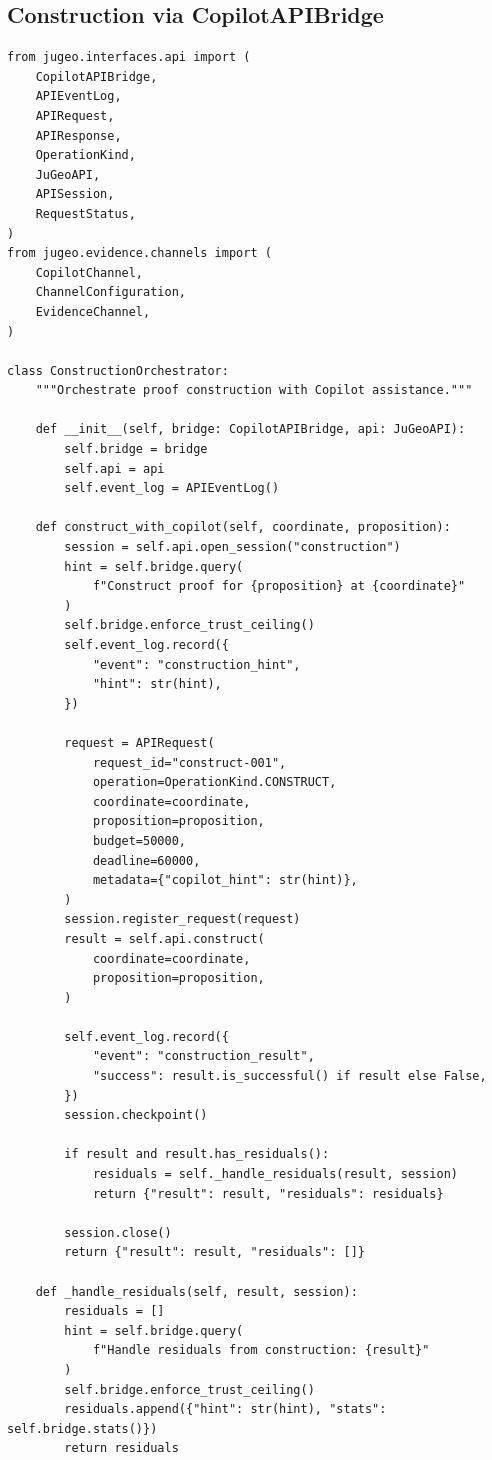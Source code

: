 \documentclass[11pt]{article}
\begin{document}
\subsection{Construction via CopilotAPIBridge}

\begin{lstlisting}[style=jugeo-python,
  caption={Proof construction with CopilotAPIBridge and JuGeoAPI},
  label={lst:conbridge}]
from jugeo.interfaces.api import (
    CopilotAPIBridge,
    APIEventLog,
    APIRequest,
    APIResponse,
    OperationKind,
    JuGeoAPI,
    APISession,
    RequestStatus,
)
from jugeo.evidence.channels import (
    CopilotChannel,
    ChannelConfiguration,
    EvidenceChannel,
)

class ConstructionOrchestrator:
    """Orchestrate proof construction with Copilot assistance."""

    def __init__(self, bridge: CopilotAPIBridge, api: JuGeoAPI):
        self.bridge = bridge
        self.api = api
        self.event_log = APIEventLog()

    def construct_with_copilot(self, coordinate, proposition):
        session = self.api.open_session("construction")
        hint = self.bridge.query(
            f"Construct proof for {proposition} at {coordinate}"
        )
        self.bridge.enforce_trust_ceiling()
        self.event_log.record({
            "event": "construction_hint",
            "hint": str(hint),
        })

        request = APIRequest(
            request_id="construct-001",
            operation=OperationKind.CONSTRUCT,
            coordinate=coordinate,
            proposition=proposition,
            budget=50000,
            deadline=60000,
            metadata={"copilot_hint": str(hint)},
        )
        session.register_request(request)
        result = self.api.construct(
            coordinate=coordinate,
            proposition=proposition,
        )

        self.event_log.record({
            "event": "construction_result",
            "success": result.is_successful() if result else False,
        })
        session.checkpoint()

        if result and result.has_residuals():
            residuals = self._handle_residuals(result, session)
            return {"result": result, "residuals": residuals}

        session.close()
        return {"result": result, "residuals": []}

    def _handle_residuals(self, result, session):
        residuals = []
        hint = self.bridge.query(
            f"Handle residuals from construction: {result}"
        )
        self.bridge.enforce_trust_ceiling()
        residuals.append({"hint": str(hint), "stats": self.bridge.stats()})
        return residuals
\end{lstlisting}
\end{document}
